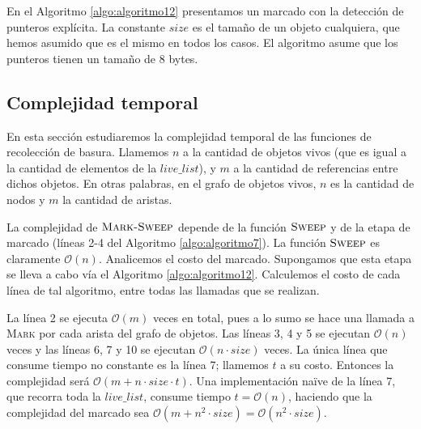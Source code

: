 \begin{algorithm}
	\dontprintsemicolon
	\Output{-}
 	\BlankLine
\caption{$\textsc{Mark}$}
\label{algo:algoritmo12}
\end{algorithm}

En el Algoritmo \ref{algo:algoritmo12} presentamos un marcado con la detección de punteros explícita. La constante $size$ es el tamaño de un objeto cualquiera, que hemos asumido que es el mismo en todos los casos. El algoritmo asume que los punteros tienen un tamaño de 8 bytes.

\subsection{Complejidad temporal}

En esta sección estudiaremos la complejidad temporal de las funciones de recolección de basura. Llamemos $n$ a la cantidad de objetos vivos (que es igual a la cantidad de elementos de la $live\_list$), y $m$ a la cantidad de referencias entre dichos objetos. En otras palabras, en el grafo de objetos vivos, $n$ es la cantidad de nodos y $m$ la cantidad de aristas.

La complejidad de $\textsc{Mark-Sweep}$ depende de la función $\textsc{Sweep}$ y de la etapa de marcado (líneas 2-4 del Algoritmo \ref{algo:algoritmo7}). La función $\textsc{Sweep}$ es claramente $\mathcal{O}(n)$. Analicemos el costo del marcado. Supongamos que esta etapa se lleva a cabo vía el Algoritmo \ref{algo:algoritmo12}. Calculemos el costo de cada línea de tal algoritmo, entre todas las llamadas que se realizan. 

La línea 2 se ejecuta $\mathcal{O}(m)$ veces en total, pues a lo sumo se hace una llamada a \textsc{Mark} por cada arista del grafo de objetos. Las líneas 3, 4 y 5 se ejecutan $\mathcal{O}(n)$ veces y las líneas 6, 7 y 10 se ejecutan $\mathcal{O}(n \cdot size)$ veces. La única línea que consume tiempo no constante es la línea 7; llamemos $t$ a su costo. Entonces la complejidad será $\mathcal{O}(m + n \cdot size \cdot t)$. Una implementación naïve de la línea 7, que recorra toda la $live\_list$, consume tiempo $t = \mathcal{O}(n)$, haciendo que la complejidad del marcado sea $\mathcal{O}(m + n^2 \cdot size) = \mathcal{O}(n^2 \cdot size)$.

